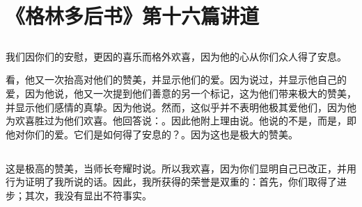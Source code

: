 
\section{《格林多后书》第十六篇讲道}


\subsection{}

我们因你们的安慰，更因的喜乐而格外欢喜，因为他的心从你们众人得了安息。\par

看，他又一次抬高对他们的赞美，并显示他们的爱。因为说过，并显示他自己的爱，因为他说，他又一次提到他们善意的另一个标记，这为他们带来极大的赞美，并显示他们感情的真挚。因为他说。然而，这似乎并不表明他极其爱他们，因为他为欢喜胜过为他们欢喜。他回答说：。因此他附上理由说。他说的不是，而是，即他对你们的爱。它们是如何得了安息的？。因为这也是极大的赞美。\par


\subsection{}

\par

这是极高的赞美，当师长夸耀时说。所以我欢喜，因为你们显明自己已改正，并用行为证明了我所说的话。因此，我所获得的荣誉是双重的：首先，你们取得了进步；其次，我没有显出不符事实。\par

\par

